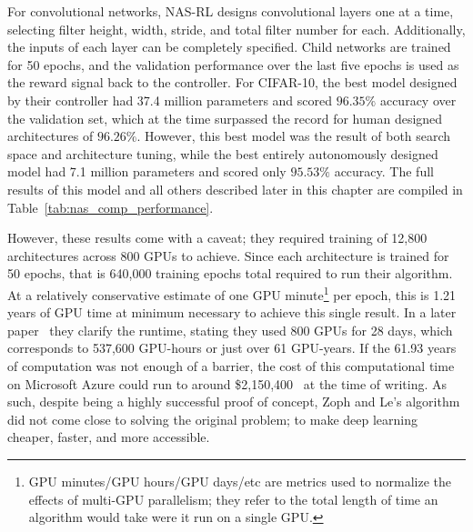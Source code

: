 For convolutional networks, NAS-RL designs convolutional layers one at a time, selecting filter height,
width, stride, and total filter number for each. Additionally, the inputs of each layer can be completely specified. Child networks
are trained for 50 epochs, and the validation performance over the last five epochs is used as the reward signal back to the
controller. For CIFAR-10, the best model designed by their controller had 37.4 million parameters and scored $96.35\%$ accuracy
over the validation set, which at the time surpassed the record for human designed architectures of $96.26\%$. However, this best model was the result of
both search space and architecture tuning, while the best entirely autonomously designed model had 7.1 million parameters and
scored only $95.53\%$ accuracy. The full results of this model and all others described later in this chapter are compiled
in Table~\ref{tab:nas_comp_performance}.

However, these
results come with a caveat; they required training of 12,800 architectures across 800 GPUs to achieve. Since each architecture is trained
for 50 epochs, that is 640,000 training epochs total required to run their algorithm. At a relatively conservative estimate of one GPU
minute\footnote{GPU minutes/GPU hours/GPU days/etc are metrics used to normalize the effects of multi-GPU parallelism;
they refer to the total length of time an algorithm would take were it run on a single GPU.} per epoch,
this is 1.21 years of GPU time at minimum necessary to achieve this single result. In a later paper~\citep{zoph_sir2017}
they clarify the runtime, stating they used 800 GPUs for 28 days, which corresponds to 537,600 GPU-hours or just over
61 GPU-years. If the 61.93 years of computation was not enough of a barrier, the cost of this computational time on Microsoft
Azure could run to around \$2,150,400~\citep{AzurePricing} at the time of writing. As such, despite being a highly successful
proof of concept, Zoph and Le's algorithm did not come close to solving the original problem; to make deep learning cheaper, faster,
and more accessible.

